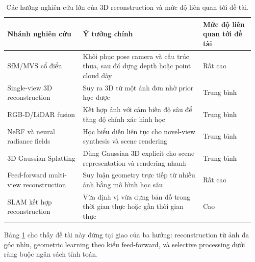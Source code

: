 \documentclass[12pt,a4paper,oneside]{report}
\begin{document}
\begin{table}[t]
\centering
\small
\begin{tabularx}{\textwidth}{>{\raggedright\arraybackslash}p{3.5cm} >{\raggedright\arraybackslash}X >{\raggedright\arraybackslash}p{3.4cm}}
\toprule
\textbf{Nhánh nghiên cứu} & \textbf{Ý tưởng chính} & \textbf{Mức độ liên quan tới đề tài} \\
\midrule
SfM/MVS cổ điển & Khôi phục pose camera và cấu trúc thưa, sau đó dựng depth hoặc point cloud dày & Rất cao \\
Single-view 3D reconstruction & Suy ra 3D từ một ảnh đơn nhờ prior học được & Trung bình \\
RGB-D/LiDAR fusion & Kết hợp ảnh với cảm biến độ sâu để tăng độ chính xác hình học & Trung bình \\
NeRF và neural radiance fields & Học biểu diễn liên tục cho novel-view synthesis và scene rendering & Trung bình \\
3D Gaussian Splatting & Dùng Gaussian 3D explicit cho scene representation và rendering nhanh & Trung bình \\
Feed-forward multi-view reconstruction & Suy luận geometry trực tiếp từ nhiều ảnh bằng mô hình học sâu & Rất cao \\
SLAM kết hợp reconstruction & Vừa định vị vừa dựng bản đồ trong thời gian thực hoặc gần thời gian thực & Cao \\
\bottomrule
\end{tabularx}
\caption{Các hướng nghiên cứu lớn của 3D reconstruction và mức độ liên quan tới đề tài.}
\label{tab:survey-directions}
\end{table}

Bảng \ref{tab:survey-directions} cho thấy đề tài này đứng tại giao của ba hướng: reconstruction từ ảnh đa góc nhìn, geometric learning theo kiểu feed-forward, và selective processing dưới ràng buộc ngân sách tính toán.
\end{document}
